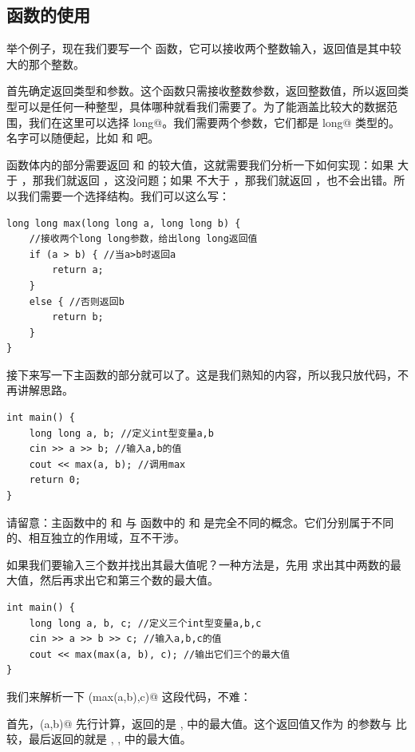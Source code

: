 \subsection*{函数的使用}
举个例子，现在我们要写一个 \lstinline@max@ 函数，它可以接收两个整数输入，返回值是其中较大的那个整数。\par
首先确定返回类型和参数。这个函数只需接收整数参数，返回整数值，所以返回类型可以是任何一种整型，具体哪种就看我们需要了。为了能涵盖比较大的数据范围，我们在这里可以选择 \lstinline@long long@。我们需要两个参数，它们都是 \lstinline@long long@ 类型的。名字可以随便起，比如 \lstinline@a@ 和 \lstinline@b@ 吧。\par
函数体内的部分需要返回 \lstinline@a@ 和 \lstinline@b@ 的较大值，这就需要我们分析一下如何实现：如果 \lstinline@a@ 大于 \lstinline@b@，那我们就返回 \lstinline@a@，这没问题；如果 \lstinline@a@ 不大于 \lstinline@b@，那我们就返回 \lstinline@b@，也不会出错。所以我们需要一个选择结构。我们可以这么写：
\begin{lstlisting}
long long max(long long a, long long b) {
    //接收两个long long参数，给出long long返回值
    if (a > b) { //当a>b时返回a
        return a;
    }
    else { //否则返回b
        return b;
    }
}
\end{lstlisting}\par
接下来写一下主函数的部分就可以了。这是我们熟知的内容，所以我只放代码，不再讲解思路。
\begin{lstlisting}
int main() {
    long long a, b; //定义int型变量a,b
    cin >> a >> b; //输入a,b的值
    cout << max(a, b); //调用max
    return 0;
}
\end{lstlisting}
请留意：主函数中的 \lstinline@a@ 和 \lstinline@b@ 与 \lstinline@max@ 函数中的 \lstinline@a@ 和 \lstinline@b@ 是完全不同的概念。它们分别属于不同的、相互独立的作用域，互不干涉。\par
如果我们要输入三个数并找出其最大值呢？一种方法是，先用 \lstinline@max@ 求出其中两数的最大值，然后再求出它和第三个数的最大值。
\begin{lstlisting}
int main() {
    long long a, b, c; //定义三个int型变量a,b,c
    cin >> a >> b >> c; //输入a,b,c的值
    cout << max(max(a, b), c); //输出它们三个的最大值
}
\end{lstlisting}
我们来解析一下 \lstinline@max(max(a,b),c)@ 这段代码，不难：\par
首先，\lstinline@max(a,b)@ 先行计算，返回的是 \lstinline@a@, \lstinline@b@ 中的最大值。这个返回值又作为 \lstinline@max@ 的参数与 \lstinline@c@ 比较，最后返回的就是 \lstinline@a@, \lstinline@b@, \lstinline@c@ 中的最大值。\par
